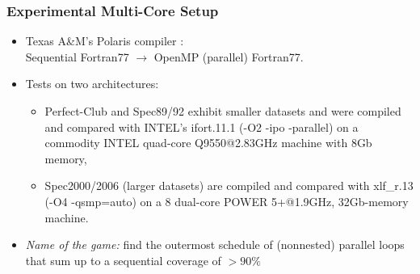 \documentclass{beamer}
\renewcommand{\emph}[1]{\textcolor{structure}{#1}}
\newcommand{\emp}[1]{\textcolor{DikuRed}{ #1}}
\begin{document}
\begin{frame}[fragile,t]
  \frametitle{Experimental Multi-Core Setup} \vspace{-1ex}
\begin{itemize}
    \item Texas A\&M's Polaris compiler $:$\\ Sequential Fortran77 $\rightarrow$ 
            OpenMP (parallel) Fortran77. \bigskip

    \item Tests on two architectures: \smallskip
        \begin{itemize}
            \item Perfect-Club and Spec89/92 exhibit smaller datasets and were compiled and 
                compared with INTEL's ifort.11.1 (-O2 -ipo -parallel) on a commodity INTEL 
                quad-core Q9550@2.83GHz machine with 8Gb memory, \bigskip
            \item Spec2000/2006 (larger datasets) are compiled and compared with
                xlf\_r.13 (-O4 -qsmp=auto) on a 8 dual-core POWER 5+@1.9GHz, 32Gb-memory machine.\bigskip
        \end{itemize}

    \item \emp{\em Name of the game:} find the outermost schedule of (nonnested) parallel
                loops that sum up to a sequential coverage of $>90\%$
\end{itemize}
\end{frame}
\end{document}
